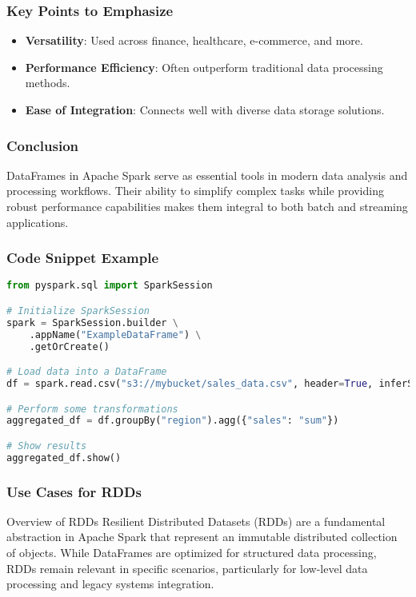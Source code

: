 \documentclass[aspectratio=169]{beamer}
\begin{document}
\begin{frame}
    \frametitle{Key Points to Emphasize}
    \begin{itemize}
        \item \textbf{Versatility}: Used across finance, healthcare, e-commerce, and more.
        \item \textbf{Performance Efficiency}: Often outperform traditional data processing methods.
        \item \textbf{Ease of Integration}: Connects well with diverse data storage solutions.
    \end{itemize}
\end{frame}

\begin{frame}[fragile]
    \frametitle{Conclusion}
    DataFrames in Apache Spark serve as essential tools in modern data analysis and processing workflows. Their ability to simplify complex tasks while providing robust performance capabilities makes them integral to both batch and streaming applications.
\end{frame}

\begin{frame}[fragile]
    \frametitle{Code Snippet Example}
    \begin{lstlisting}[language=Python]
from pyspark.sql import SparkSession

# Initialize SparkSession
spark = SparkSession.builder \
    .appName("ExampleDataFrame") \
    .getOrCreate()

# Load data into a DataFrame
df = spark.read.csv("s3://mybucket/sales_data.csv", header=True, inferSchema=True)

# Perform some transformations
aggregated_df = df.groupBy("region").agg({"sales": "sum"})

# Show results
aggregated_df.show()
    \end{lstlisting}
\end{frame}

\begin{frame}[fragile]
    \frametitle{Use Cases for RDDs}
    
    \begin{block}{Overview of RDDs}
        Resilient Distributed Datasets (RDDs) are a fundamental abstraction in Apache Spark that represent an immutable distributed collection of objects. While DataFrames are optimized for structured data processing, RDDs remain relevant in specific scenarios, particularly for low-level data processing and legacy systems integration.
    \end{block}
\end{frame}
\end{document}
